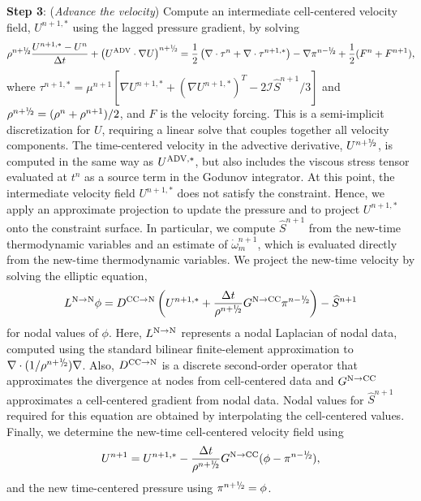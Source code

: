 {\bf Step 3}: ({\it Advance the velocity}) Compute an intermediate cell-centered velocity field, 
$U^{n+1,*}$ using the lagged pressure gradient, by solving
\begin{equation}
\rho^{n+\myhalf}\frac{U^{n+1,*}-U^n}{\Delta t} + \left(\uadv\cdot\nabla U\right)^{n+\myhalf} = \half\left(\nabla\cdot\tau^n + \nabla\cdot\tau^{n+1,*}\right) - \nabla\pi^{n-\myhalf} + \frac{1}{2}(F^n + F^{n+1}),
\end{equation}
where $\tau^{n+1,*} = \mu^{n+1}[\nabla U^{n+1,*} +(\nabla U^{n+1,*})^T - 2\mathcal{I}\widehat S^{n+1}/3]$ and 
$\rho^{n+\myhalf} = (\rho^n + \rho^{n+1})/2$, and $F$ is the velocity forcing.  This is a semi-implicit discretization for $U$, requiring
a linear solve that couples together all velocity components.  The time-centered velocity in the advective derivative,
$U^{n+\myhalf}$, is computed in the same way 
as $U^{{\rm ADV},*}$, but also includes the viscous stress tensor evaluated at $t^n$ as a source term
in the Godunov integrator.  At 
this point, the intermediate velocity field $U^{n+1,*}$ does not satisfy the constraint.  Hence, we apply an 
approximate projection to update the pressure and to project $U^{n+1,*}$ onto the constraint surface.  
In particular, we compute $\widehat S^{n+1}$ from the new-time 
thermodynamic variables and an estimate of $\dot\omega_m^{n+1}$, which is evaluated
directly from the new-time thermodynamic variables. We project the new-time velocity by solving the elliptic equation,
\begin{equation}
L^{{\rm N}\rightarrow{\rm N}}\phi = D^{{\rm CC}\rightarrow{\rm N}}\left(U^{n+1,*} + \frac{\Delta t}{\rho^{n+\myhalf}}G^{{\rm N}\rightarrow{\rm CC}}\pi^{n-\myhalf}\right) - \widehat S^{n+1}
\end{equation}
for nodal values of $\phi$.  Here, $L^{{\rm N}\rightarrow{\rm N}}$ represents a nodal Laplacian of nodal data, computed
using the standard bilinear finite-element approximation to $\nabla\cdot(1/\rho^{n+\myhalf})\nabla$.
Also, $D^{{\rm CC}\rightarrow{\rm N}}$ is a discrete
second-order operator that approximates the divergence at nodes from cell-centered data 
and $G^{{\rm N}\rightarrow{\rm CC}}$ approximates a cell-centered gradient from nodal data.  Nodal 
values for $\widehat S^{n+1}$ required for this equation are obtained by interpolating the cell-centered values.  Finally, we 
determine the new-time cell-centered velocity field using
\begin{equation}
U^{n+1} = U^{n+1,*} - \frac{\Delta t}{\rho^{n+\myhalf}}G^{{\rm N}\rightarrow{\rm CC}}(\phi-\pi^{n-\myhalf}),
\end{equation}
and the new time-centered pressure using $\pi^{n+\myhalf} = \phi$.

